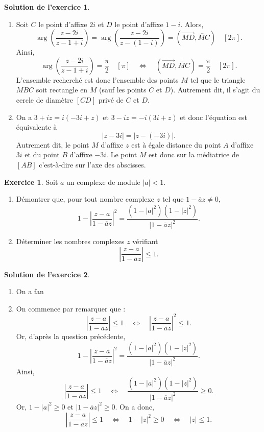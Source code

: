 \documentclass[a4paper, 11pt,openany]{article}%
\theoremstyle{plain}
\theoremstyle{definition}
\newtheorem{exo}{Exercice}
\newtheorem{sol}{Solution de l'exercice}
\theoremstyle{remark}
\begin{document}
\begin{sol}
\begin{enumerate}
\item Soit $C$ le point d'affixe $2i$ et $D$ le point d'affixe $1-i$. Alors,
\[ \arg \left( \frac{z-2i}{z-1+i} \right) = \arg \left( \frac{z-2i}{z-(1-i)} \right) = (\overrightarrow{MD},\overleftarrow{MC}) \quad [2\pi].\]
Ainsi,
\[ \arg \left( \frac{z-2i}{z-1+i} \right) = \frac{\pi}{2} \quad [\pi] \quad \Leftrightarrow \quad  (\overrightarrow{MD},\overleftarrow{MC}) = \frac{\pi}{2} \quad [2\pi].\]
L'ensemble recherché est donc l'ensemble des points $M$ tel que le triangle $MBC$ soit rectangle en $M$ (sauf les points $C$ et $D$). Autrement dit, il s'agit du cercle de diamètre $[CD]$ privé de $C$ et $D$.
\item On a $3+iz=i(-3i+z)$ et $3-iz=-i(3i+z)$ et donc l'équation est équivalente à 
\[ |z-3i|=|z-(-3i)|.\]
 Autrement dit, le point $M$ d'affixe $z$ est à égale distance du point $A$ d'affixe $3i$ et du point $B$ d'affixe $-3i$. Le point $M$ est donc sur la médiatrice de $[AB]$ c'est-à-dire sur l'axe des abscisses. 
\end{enumerate}
\end{sol}


\begin{exo}
Soit $a$ un complexe de module $|a|<1$.
\begin{enumerate}
\item Démontrer que, pour tout nombre complexe $z$ tel que $1- \overline{a}z  \neq 0$,
\[ 1- \left| \frac{z-a}{1- \overline{a} z} \right|^2 = \frac{(1-|a|^2)(1-|z|^2)}{|1-\overline{a}z|^2}.\]
\item Déterminer les nombres complexes $z$ vérifiant 
\[ \left| \frac{z-a}{1 - \overline{a}z} \right| \leqslant 1.\]
\end{enumerate}
\end{exo}

   
\begin{sol}
\begin{enumerate}
\item On a
fan
\item On commence  par remarquer que : 
\[ \left| \frac{z-a}{1 - \overline{a}z} \right| \leqslant 1 \quad \Leftrightarrow \quad \left| \frac{z-a}{1 - \overline{a}z} \right|^2 \leqslant 1.\]
Or, d'après la question précédente,
\[ 1- \left| \frac{z-a}{1- \overline{a} z} \right|^2 = \frac{(1-|a|^2)(1-|z|^2)}{|1-\overline{a}z|^2}.\]
Ainsi,
\[ \left| \frac{z-a}{1 - \overline{a}z} \right| \leqslant 1 \quad \Leftrightarrow \quad \frac{(1-|a|^2)(1-|z|^2)}{|1-\overline{a}z|^2} \geqslant 0.\]
Or, $1 - |a|^2 \geqslant 0$ et $|1-\overline{a}z|^2 \geqslant 0$. On a donc,
\[ \left| \frac{z-a}{1 - \overline{a}z} \right| \leqslant 1 \quad \Leftrightarrow \quad 1 - |z|^2 \geqslant 0 \quad \Leftrightarrow \quad |z| \leqslant 1.\]
\end{enumerate}
\end{sol}
\end{document}
